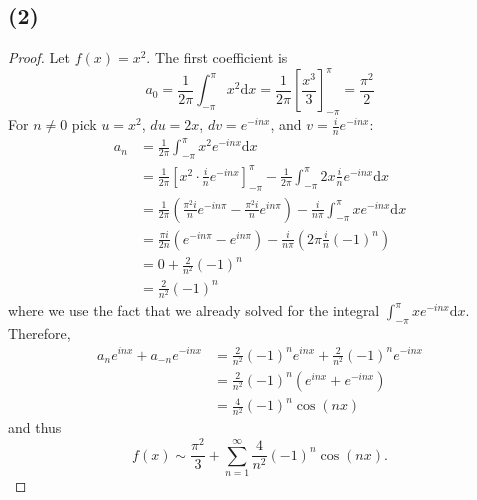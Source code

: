 \documentclass{article}
\begin{document}
\subsection*{(2)}
\begin{proof}
  Let $f(x) = x^2$. The first coefficient is 
  \[
  a_0 = \frac{1}{2 \pi}\int_{-\pi}^{\pi}x^2 \mathrm{d}x = \frac{1}{2 \pi}\left[\frac{x^3}{3}\right]_{-\pi}^{\pi} = \frac{\pi^2}{2}  
  \]
  For $n \neq 0$ pick $u = x^2$, $du = 2x$, $dv = e^{-inx}$, and $v = \frac{i}{n}e^{-inx}$:
  \begin{align*}
    a_n &= \frac{1}{2 \pi}\int_{-\pi}^{\pi}x^2e^{-inx}\mathrm{d}x \\
    &= \frac{1}{2 \pi} \left[x^2 \cdot \frac{i}{n}e^{-inx} \right]_{-\pi}^{\pi}- \frac{1}{2 \pi}\int_{-\pi}^{\pi}2x\frac{i}{n}e^{-inx}\mathrm{d}x \\
    &= \frac{1}{2 \pi}\left(\frac{\pi^2 i}{n}e^{-in\pi} - \frac{\pi^2 i}{n}e^{in \pi} \right) - \frac{i}{n \pi}\int_{-\pi}^{\pi}xe^{-inx}\mathrm{d}x \\
    &= \frac{\pi i}{2n}\left(e^{-in \pi} - e^{in \pi } \right) - \frac{i}{n \pi }\left(2 \pi \frac{i}{n}(-1)^n\right) \\
    &= 0 + \frac{2}{n^2}(-1)^n \\
    &= \frac{2}{n^2}(-1)^n
  \end{align*}
  where we use the fact that we already solved for the integral $\int_{-\pi}^{\pi}xe^{-inx}\mathrm{d}x$. 
  Therefore, 
  \begin{align*}
    a_ne^{inx} + a_{-n}e^{-inx} &= \frac{2}{n^2}(-1)^ne^{inx} + \frac{2}{n^2}(-1)^ne^{-inx} \\
    &= \frac{2}{n^2}(-1)^n\left(e^{inx} + e^{-inx} \right) \\
    &= \frac{4}{n^2}(-1)^n\cos(nx)
  \end{align*}
  and thus
  \[
  f(x) \sim \frac{\pi^2}{3}+ \sum\limits_{n = 1}^{\infty}\frac{4}{n^2}(-1)^n\cos(nx).   
  \]
\end{proof}
\end{document}
